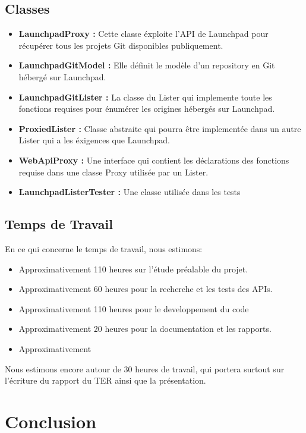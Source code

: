 \documentclass[12pt,a4paper]{report}
\begin{document}
\section{Classes}
\begin{itemize}
\item \textbf{LaunchpadProxy :} Cette classe éxploite l'API de Launchpad pour récupérer tous les projets Git disponibles publiquement.
\item \textbf{LaunchpadGitModel : } Elle définit le modèle d'un repository en Git hébergé sur Launchpad.
\item \textbf{LaunchpadGitLister : } La classe du Lister qui implemente toute les fonctions requises pour énumérer les origines hébergés sur Launchpad.
\item \textbf{ProxiedLister : } Classe abstraite qui pourra être implementée dans un autre Lister qui a les éxigences que Launchpad.
\item \textbf{WebApiProxy : } Une interface qui contient les déclarations des fonctions requise dans une classe Proxy utilisée par un Lister.
\item \textbf{LaunchpadListerTester :} Une classe utilisée dans les tests
\end{itemize}

\section{Temps de Travail}
En ce qui concerne le temps de travail, nous estimons:
\begin{itemize}
\item Approximativement 110 heures sur l'étude préalable du projet.
\item Approximativement 60 heures pour la recherche et les tests des APIs.
\item Approximativement 110 heures pour le developpement du code
\item Approximativement 20 heures pour la documentation et les rapports.
\item Approximativement 
\end{itemize}

Nous estimons encore autour de 30 heures de travail, qui portera surtout sur l'écriture du rapport du TER ainsi que la présentation.
\chapter{Conclusion}
\end{document}
